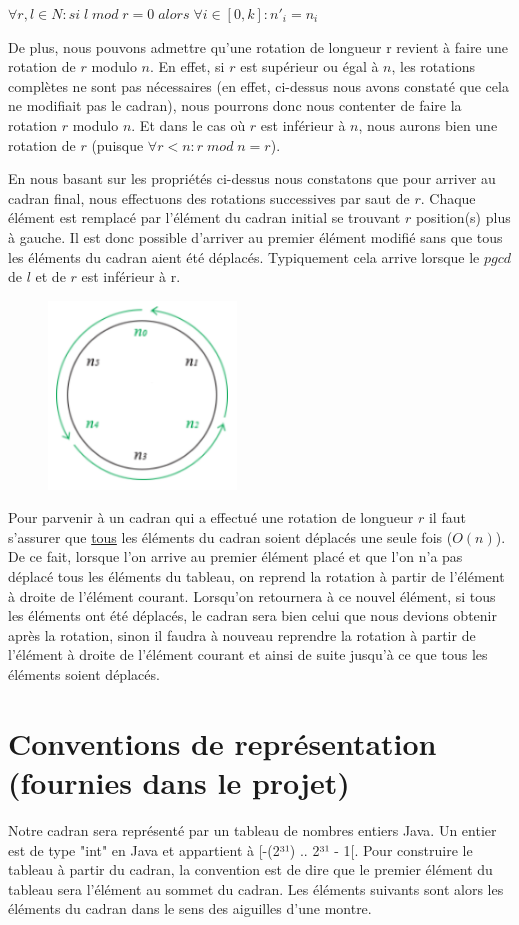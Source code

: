 	$ \forall r, l \in N : si \; l \; mod \; r = 0 \; alors \; \forall i \in [0, k]:n'_i = n_i $ 
	
	De plus, nous pouvons admettre qu’une rotation de longueur r revient à faire une rotation de $r$ modulo $n$. En effet, si $r$ est supérieur ou égal à $n$, les rotations complètes ne sont pas nécessaires (en effet, ci-dessus nous avons constaté que cela ne modifiait pas le cadran), nous pourrons donc nous contenter de faire la rotation $r$ modulo $n$. Et dans le cas où $r$ est inférieur à $n$, nous aurons bien une rotation de $r$ (puisque $\forall r<n: r \; mod \; n = r$).
	
	En nous basant sur les propriétés ci-dessus nous constatons que pour arriver au cadran final, nous effectuons des rotations successives par saut de $r$. Chaque élément est remplacé par l’élément du cadran initial se trouvant $r$ position(s) plus à gauche. Il est donc possible d’arriver au premier élément modifié sans que tous les éléments du cadran aient été déplacés. Typiquement cela arrive lorsque le $pgcd$ de $l$ et de $r$ est inférieur à r.
		\begin{figure}[h]
			\centering
			\includegraphics[height=5cm]{5}
			\caption{}
		\end{figure}	

	Pour parvenir à un cadran qui a effectué une rotation de longueur $r$ il faut s’assurer que \underline{tous} les éléments du cadran soient déplacés une seule fois ($O(n)$). De ce fait, lorsque l’on arrive au premier élément placé et que l’on n’a pas déplacé tous les éléments du tableau, on reprend la rotation à partir de l’élément à droite de l’élément courant. Lorsqu’on retournera à ce nouvel élément, si tous les éléments ont été déplacés, le cadran sera bien celui que nous devions obtenir après la rotation, sinon il faudra à nouveau reprendre la rotation à partir de l’élément à droite de l’élément courant et ainsi de suite jusqu’à ce que tous les éléments soient déplacés.
	
	\section{Conventions de représentation (fournies dans le projet)}
	Notre cadran sera représenté par un tableau de nombres entiers Java. Un entier est de type "int" en Java et appartient à [-(2³¹) .. 2³¹ - 1[. Pour construire le tableau à partir du cadran, la convention est de dire que le premier élément du tableau sera l’élément au sommet du cadran. Les éléments suivants sont alors les éléments du cadran dans le sens des aiguilles d’une montre.
	\newpage

